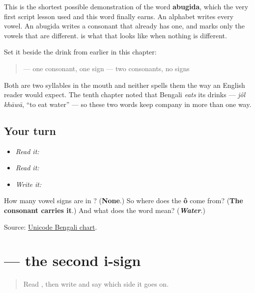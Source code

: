 This is the shortest possible demonstration of the word \textbf{abugida}, which the very first script lesson used and this word finally earns. An alphabet writes every vowel. An abugida writes a consonant that already has one, and marks only the vowels that are different. \textbf{} is what that looks like when nothing is different.

Set it beside the drink from earlier in this chapter:

\begin{quote}
\textbf{} — one consonant, one sign \textbf{} — two consonants, no signs
\end{quote}

Both are two syllables in the mouth and neither spells them the way an English reader would expect. The tenth chapter noted that Bengali \emph{eats} its drinks — \emph{jôl khāwā}, \textquotedblleft{}to eat water\textquotedblright{} — so these two words keep company in more than one way.

\subsection*{Your turn}
\begin{itemize}
\raggedright
  \item \emph{Read it:} 
  \item \emph{Read it:}   
  \item \emph{Write it:} 
\end{itemize}

\begin{tcolorbox}[breakable,colback=teal!4,colframe=teal!35!black,title={Before you move on}]
How many vowel signs are in \textbf{}? (\textbf{None}.) So where does the \textbf{ô} come from? (\textbf{The consonant carries it}.) And what does the word mean? (\emph{\textbf{Water}}.)

Source: \href{https://www.unicode.org/charts/PDF/U0980.pdf}{Unicode Bengali chart}.
\end{tcolorbox}
\section[-i (long)]{ — the second i-sign}

\label{lesson:BN-W04-ii-matra}



\begin{quote}
Read \textbf{}, then write \textbf{} and say which side it goes on.
\end{quote}

